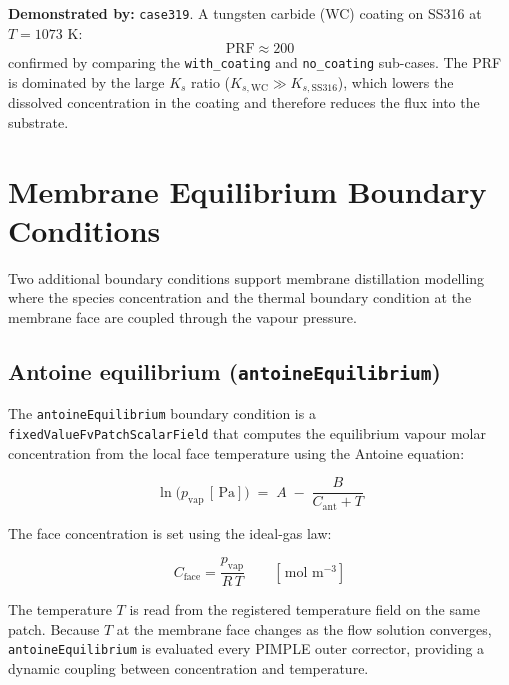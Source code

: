 \documentclass[11pt,a4paper]{article}
\newcommand{\mol}{\,\text{mol}}
\newcommand{\m}{\,\text{m}}
\newcommand{\K}{\,\text{K}}
\newcommand{\Pa}{\,\text{Pa}}
\newcommand{\caseref}[1]{\texttt{\color{casegreen}#1}}
\newcommand{\bctype}[1]{\texttt{\color{foamblue}#1}}
\begin{document}
\begin{tcolorbox}[casebox]
  \textbf{Demonstrated by:} \caseref{case319}.
  A tungsten carbide (WC) coating on SS316 at $T = 1073\,\K$:
  \[
    \mathrm{PRF} \approx 200
  \]
  confirmed by comparing the \texttt{with\_coating} and \texttt{no\_coating}
  sub-cases.  The PRF is dominated by the large $K_s$ ratio ($K_{s,\text{WC}} \gg
  K_{s,\text{SS316}}$), which lowers the dissolved concentration in the coating
  and therefore reduces the flux into the substrate.
\end{tcolorbox}

\section{Membrane Equilibrium Boundary Conditions}
\label{sec:membc}

Two additional boundary conditions support membrane distillation modelling
where the species concentration and the thermal boundary condition at the
membrane face are coupled through the vapour pressure.

\subsection{Antoine equilibrium (\texttt{antoineEquilibrium})}
\label{sec:antoine}

The \bctype{antoineEquilibrium} boundary condition is a
\texttt{fixedValueFvPatchScalarField} that computes the equilibrium vapour
molar concentration from the local face temperature using the Antoine equation:

\begin{tcolorbox}[eqbox,title={Antoine vapour pressure}]
\begin{equation}\label{eq:antoine}
  \ln\bigl(p_\text{vap}\,[\Pa]\bigr)
  \;=\; A \;-\; \frac{B}{C_\text{ant} + T}
\end{equation}
\end{tcolorbox}

The face concentration is set using the ideal-gas law:

\begin{equation}\label{eq:antoine_C}
  C_\text{face} = \frac{p_\text{vap}}{R\,T} \qquad [\mol\,\m^{-3}]
\end{equation}

The temperature $T$ is read from the registered temperature field on the same
patch.  Because $T$ at the membrane face changes as the flow solution
converges, \bctype{antoineEquilibrium} is evaluated every PIMPLE outer
corrector, providing a dynamic coupling between concentration and temperature.
\end{document}
